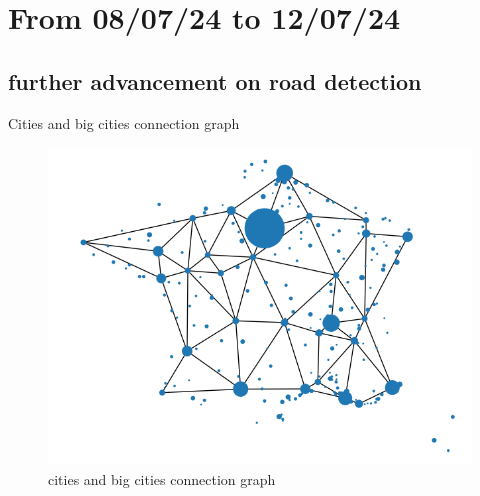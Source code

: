 \smallframetitle

\section{From 08/07/24 to 12/07/24}
\insertsectionframe

\subsection{further advancement on road detection}
\insertsubsectionframe

\begin{frame}{Cities and big cities connection graph}
    \begin{figure}
        \includegraphics[height=0.6\paperheight]{images/road_detection/city_links_graph_all_cities.png}
        \caption{cities and big cities connection graph}
    \end{figure}
\end{frame}

